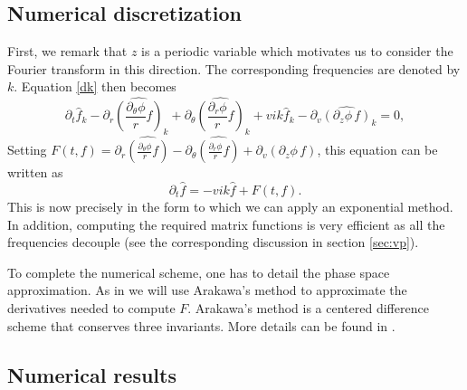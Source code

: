 \subsection{Numerical discretization}

First, we remark that $z$ is a periodic variable which motivates us to consider the Fourier transform in this direction. The corresponding frequencies are denoted by $k$. Equation \eqref{dk} then becomes
$$
  \partial_t \hat{f}_k -\partial_r \widehat{\left(\frac{\partial_\theta \phi}{r}f\right)}_k+\partial_\theta \widehat{\left(\frac{\partial_r \phi}{r} f\right)}_k +vik \hat{f}_k-\partial_v\widehat{\left( \partial_z\phi \, f\right)}_k=0, 
$$
Setting $F(t, f)= \partial_r \widehat{\left(\frac{\partial_\theta \phi}{r}f\right)}-\partial_\theta \widehat{\left(\frac{\partial_r \phi}{r} f\right)} +\partial_v\widehat{\left( \partial_z\phi \,f\right)}$, this equation can be written as
$$
  \partial_t \hat{f} = - vik \hat{f} + F(t, f). 
$$
This is now precisely in the form to which we can apply an exponential method. In addition, computing the required matrix functions is very efficient as all the frequencies decouple (see the corresponding discussion in section \ref{sec:vp}).

To complete the numerical scheme, one has to detail the phase space approximation. As in \cite{Crouseilles:2018} we will use Arakawa's method to approximate the derivatives needed to compute $F$. Arakawa's method is a centered difference scheme that conserves three invariants. More details can be found in \cite{Crouseilles:2018}.



\subsection{Numerical results \label{subsec:driftkinetic-results}}

